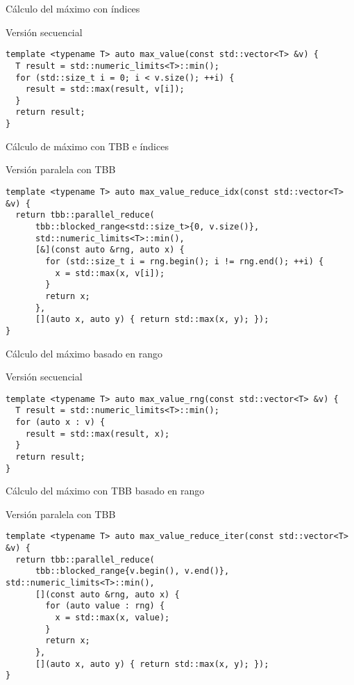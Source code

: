 \begin{frame}[t,fragile]{Cálculo del máximo con índices}
\begin{block}{Versión secuencial}
\begin{lstlisting}
template <typename T> auto max_value(const std::vector<T> &v) {
  T result = std::numeric_limits<T>::min();
  for (std::size_t i = 0; i < v.size(); ++i) {
    result = std::max(result, v[i]);
  }
  return result;
}
\end{lstlisting}
\end{block}
\end{frame}

\begin{frame}[t,fragile]{Cálculo de máximo con TBB e índices}
\begin{block}{Versión paralela con TBB}
\begin{lstlisting}
template <typename T> auto max_value_reduce_idx(const std::vector<T> &v) {
  return tbb::parallel_reduce(
      tbb::blocked_range<std::size_t>{0, v.size()},
      std::numeric_limits<T>::min(),
      [&](const auto &rng, auto x) {
        for (std::size_t i = rng.begin(); i != rng.end(); ++i) {
          x = std::max(x, v[i]);
        }
        return x;
      },
      [](auto x, auto y) { return std::max(x, y); });
}
\end{lstlisting}
\end{block}
\end{frame}

\begin{frame}[t,fragile]{Cálculo del máximo basado en rango}
\begin{block}{Versión secuencial}
\begin{lstlisting}
template <typename T> auto max_value_rng(const std::vector<T> &v) {
  T result = std::numeric_limits<T>::min();
  for (auto x : v) {
    result = std::max(result, x);
  }
  return result;
}
\end{lstlisting}
\end{block}
\end{frame}

\begin{frame}[t,fragile]{Cálculo del máximo con TBB basado en rango}
\begin{block}{Versión paralela con TBB}
\begin{lstlisting}
template <typename T> auto max_value_reduce_iter(const std::vector<T> &v) {
  return tbb::parallel_reduce(
      tbb::blocked_range{v.begin(), v.end()}, std::numeric_limits<T>::min(),
      [](const auto &rng, auto x) {
        for (auto value : rng) {
          x = std::max(x, value);
        }
        return x;
      },
      [](auto x, auto y) { return std::max(x, y); });
}
\end{lstlisting}
\end{block}
\end{frame}

